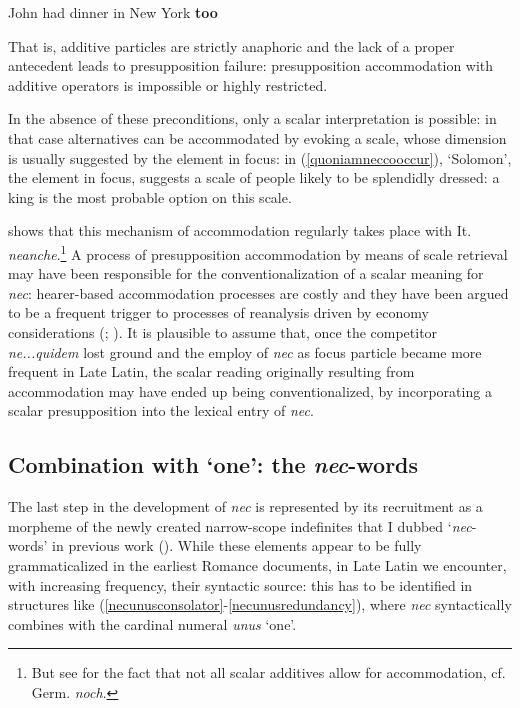 \documentclass[output=paper,modfonts,nonflat,citecolor=brown,
showindex
]{langsci/langscibook}
\begin{document}
{\begin{exe}
\ex {}  John had dinner in New York {\textbf{too}}
\end{exe}}

\noindent That is, additive particles are strictly anaphoric and the lack of a proper antecedent leads to presupposition failure: presupposition accommodation with additive operators is impossible or highly restricted. 

In the absence of these preconditions, only a scalar interpretation is possible: in that case alternatives can be accommodated by evoking a scale, whose dimension is usually suggested by the element in focus: in (\ref{quoniamneccooccur}), `Solomon', the element in focus, suggests a scale of people likely to be splendidly dressed: a king is the most probable option on this scale. 

\citet{Tovena06} shows that this mechanism of accommodation regularly takes place with It. {\emph{neanche}}.{\footnote{But see \citet{Umbach12} for the fact that not all scalar additives allow for accommodation, cf. Germ. {\emph{noch}}.}} A process of presupposition accommodation by means of scale retrieval may have been responsible for the conventionalization of a scalar meaning for {\emph{nec}}: hearer-based accommodation processes are costly and they have been argued to be a frequent trigger to processes of reanalysis driven by economy considerations (\citealt[]{TraugottDasher02, Eckardt06}; \citealt[]{SchwenterWaltereit10}). It is plausible to assume that, once the competitor {\emph{ne...quidem}} lost ground and the employ of {\emph{nec}} as focus particle became more frequent in Late Latin, the scalar reading originally resulting from accommodation may have ended up being conventionalized, by incorporating a scalar presupposition into the lexical entry of {\emph{nec}}.
                                                     
\subsection{Combination with `one': the {\emph{nec}}-words} \label{necwordssection}

The last step in the development of {\emph{nec}} is represented by its recruitment as a morpheme of the newly created narrow-scope indefinites that I dubbed `{\emph{nec}}-words' in previous work (\citealt[chapter 5]{Gianollo18}). While these elements appear to be fully grammaticalized in the earliest Romance documents, in Late Latin we encounter, with increasing frequency, their syntactic source: this has to be identified in structures like (\ref{necunusconsolator}-\ref{necunusredundancy}), where {\emph{nec}} syntactically combines with the cardinal numeral {\emph{unus}} `one'.
\end{document}

